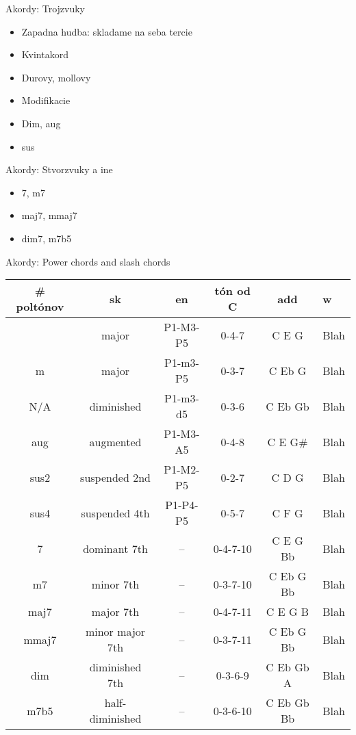 \begin{center}
 \quad {}
\end{center}


Akordy: Trojzvuky

\begin{itemize}
    \item Zapadna hudba: skladame na seba tercie
    \item Kvintakord
    \item Durovy, mollovy
    \item Modifikacie
    \item Dim, aug
    \item sus
\end{itemize}

Akordy: Stvorzvuky a ine

\begin{itemize}
    \item 7, m7
    \item maj7, mmaj7
    \item dim7, m7b5
\end{itemize}

Akordy: Power chords and slash chords

\begin{tabularx}{\linewidth}{ c c c c c X }
    \# poltónov & sk & en & tón od C & add & w \\ 
    \hline
      & major & P1-M3-P5 & 0-4-7 & C E G & Blah \\
    m & major & P1-m3-P5 & 0-3-7 & C Eb G & Blah \\
    N/A & diminished & P1-m3-d5 & 0-3-6 & C Eb Gb & Blah \\
    aug & augmented & P1-M3-A5 & 0-4-8 & C E G\# & Blah \\
    sus2 & suspended 2nd & P1-M2-P5 & 0-2-7 & C D G & Blah \\
    sus4 & suspended 4th & P1-P4-P5 & 0-5-7 & C F G & Blah \\
    7 & dominant 7th & -- & 0-4-7-10 & C E G Bb & Blah \\
    m7 & minor 7th & -- & 0-3-7-10 & C Eb G Bb & Blah \\
    maj7 & major 7th & -- & 0-4-7-11 & C E G B & Blah \\
    mmaj7 & minor major 7th & -- & 0-3-7-11 & C Eb G Bb & Blah \\
    dim & diminished 7th & -- & 0-3-6-9 & C Eb Gb A & Blah \\
    m7b5 & half-diminished & -- & 0-3-6-10 & C Eb Gb Bb & Blah \\
\end{tabularx}

\endgroup